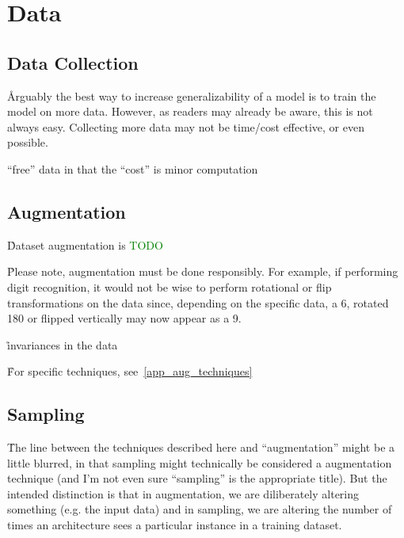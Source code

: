 \section{Data}

\subsection{Data Collection}

\r{Arguably the best way to increase generalizability of a model is to train the model on more data. However, as readers may already be aware, this is not always easy. Collecting more data may not be time/cost effective, or even possible.}

\r{``free'' data in that the ``cost'' is minor computation}

\subsection{Augmentation}

\r{Dataset augmentation is \textcolor{green}{TODO}}

\r{Please note, augmentation must be done responsibly. For example, if performing digit recognition, it would not be wise to perform rotational or flip transformations on the data since, depending on the specific data, a 6, rotated 180 or flipped vertically may now appear as a 9.}


\r{invariances in the data}

\r{For specific techniques, see~\ref{app_aug_techniques}}



\subsection{Sampling}

\r{The line between the techniques described here and ``augmentation'' might be a little blurred, in that sampling might technically be considered a augmentation technique (and I'm not even sure ``sampling'' is the appropriate title). But the intended distinction is that in augmentation, we are diliberately altering something (e.g. the input data) and in sampling, we are altering the number of times an architecture sees a particular instance in a training dataset.}

